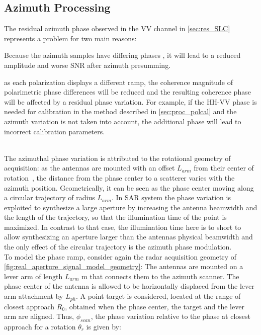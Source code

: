 \subsection{Azimuth Processing}\label{sec:azimuth_processing}
The residual  azimuth phase observed in the VV channel in \autoref{sec:res_SLC} represents a problem for two main reasons: \begin{enumerate*}
	\item Because the azimuth samples have differing phases
	, it will lead to a reduced amplitude and worse SNR after azimuth presumming. 
  \item as each polarization displays a different ramp, the coherence magnitude of polarimetric phase differences will be reduced and the resulting coherence phase will be affected by a residual phase variation. For example, if the HH-VV phase is needed for calibration in the method described in \autoref{sec:proc_polcal} and the azimuth variation is not taken into account, the additional phase will lead to incorrect calibration parameters.\label{item:phase_variation}\end{enumerate*}\\
The azimuthal phase variation is attributed to the rotational geometry of acquisition: as the antennas are mounted with an  offset $L_{arm}$ from their center of rotation~\cite{Lee2014}, the distance from the phase center to a scatterer varies with the azimuth position. Geometrically, it can be seen as the phase center moving along a circular trajectory of radius $L_{arm}$. In SAR system the phase variation is exploited to synthesize a large aperture by increasing the antenna beamwidth and the length of the trajectory, so that the illumination time of the point is maximized. In contrast to that case, the illumination time here is to short to allow synthesizing an aperture larger than the antennas physical beamwidth and the only effect of the circular trajectory is the azimuth phase modulation.\\
To model the phase ramp, consider again the radar acquisition geometry of \autoref{fig:real_aperture_signal_model_geometry}:
The antennas are mounted on a lever arm of length $L_{arm}$ m that connects them to the azimuth scanner. The phase center of the antenna is allowed to be horizontally displaced from the lever arm attachment by $L_{ph}$.
A point target is considered, located at the  range of closest approach $R_{0}$, obtained when the phase center, the target and the lever arm are aligned. Thus, $\phi_{scan}$, the phase variation relative to the phase at closest approach for a rotation  $\theta_r$  is given by:
